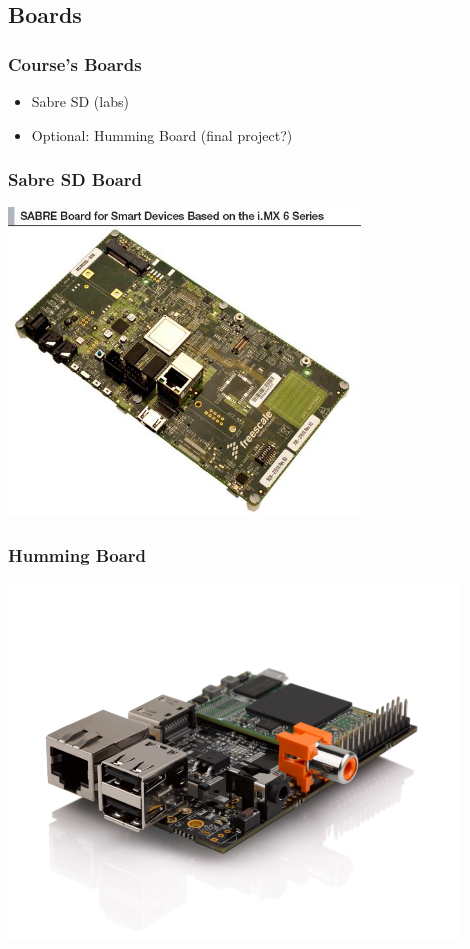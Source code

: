 \subsection{Boards}

\begin{frame}
  \frametitle{Course's Boards}
  \begin{itemize}
  \item Sabre SD (labs)
  \item Optional: Humming Board (final project?)
  \end{itemize}
\end{frame}

\begin{frame}
  \frametitle{Sabre SD Board}
  \begin{center}
    \includegraphics[width=0.7\textwidth]{agenda/RDIMX6SABREBRD_BD.jpg}\\
  \end{center}
\end{frame}

\begin{frame}
  \frametitle{Humming Board}
  \begin{center}
    \includegraphics[width=0.9\textwidth]{agenda/HummingBoard-i2.png}\\
  \end{center}
\end{frame}
